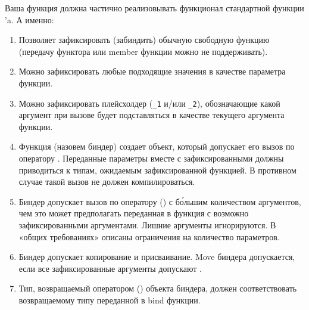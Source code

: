\documentclass[a4paper,10pt]{article}
\begin{document}
Ваша функция  должна частично реализовывать функционал стандартной
функции ’a. А именно:
\begin{enumerate}
    \item Позволяет зафиксировать (забиндить) обычную свободную функцию (передачу
        функтора или member функции можно не поддерживать).
    \item Можно зафиксировать любые подходящие значения в качестве параметра функции.
    \item Можно зафиксировать плейсхолдер (\verb!_1! и/или \verb!_2!), обозначающие какой аргумент
        при вызове будет подставляться в качестве текущего аргумента функции.
    \item Функция  (назовем биндер) создает объект, который допускает его вызов по
        оператору \cpp{()}. Переданные параметры вместе с зафиксированными должны приводиться
        к типам, ожидаемым зафиксированной функцией. В противном случае такой вызов не
        должен компилироваться.
    \item Биндер допускает вызов по оператору () с б\'{о}льшим количеством аргументов, чем
        это может предполагать переданная в  функция с возможно зафиксированными
        аргументами. Лишние аргументы игнорируются. В «общих требованиях» описаны
        ограничения на количество параметров.
    \item Биндер допускает копирование и присваивание. Move биндера допускается, если
        все зафиксированные аргументы допускают .
    \item Тип, возвращаемый оператором () объекта биндера, должен соответствовать
        возвращаемому типу переданной в bind функции.
\end{enumerate}
\end{document}

